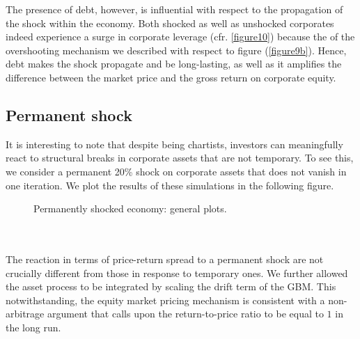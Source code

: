 \documentclass[11pt]{article}
\begin{document}
The presence of debt, however, is influential with respect to the propagation of the shock within the economy. Both shocked as well as unshocked corporates indeed experience a surge in corporate leverage (cfr. \ref{figure10}) because the of the overshooting mechanism we described with respect to figure (\ref{figure9b}). Hence, debt makes the shock propagate and be long-lasting, as well as it amplifies the difference between the market price and the gross return on corporate equity.

\subsection{Permanent shock}
It is interesting to note that despite being chartists, investors can meaningfully react to structural breaks in corporate assets that are not temporary. To see this, we consider a permanent 20\% shock on corporate assets that does not vanish in one iteration. We plot the results of these simulations in the following figure.
\begin{figure}[h!]
\centering
{}\quad
{}
 \caption{Permanently shocked economy: general plots.} \label{figure11}
\end{figure}\\\\
The reaction in terms of price-return spread to a permanent shock are not crucially different from those in response to temporary ones. We further allowed the asset process to be integrated by scaling the drift term of the GBM. This notwithstanding, the equity market pricing mechanism is consistent with a non-arbitrage argument that calls upon the return-to-price ratio to be equal to $1$ in the long run.
\end{document}
